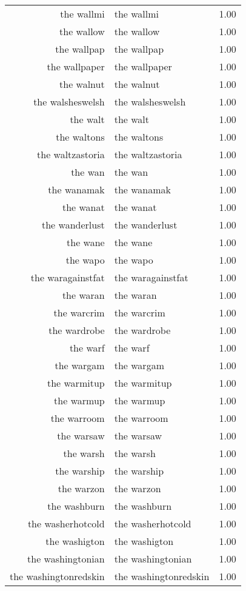 \begin{table}[ht]
\begin{tabular}{rlr}
  the wallmi & the wallmi & 1.00 \\ 
  the wallow & the wallow & 1.00 \\ 
  the wallpap & the wallpap & 1.00 \\ 
  the wallpaper & the wallpaper & 1.00 \\ 
  the walnut & the walnut & 1.00 \\ 
  the walsheswelsh & the walsheswelsh & 1.00 \\ 
  the walt & the walt & 1.00 \\ 
  the waltons & the waltons & 1.00 \\ 
  the waltzastoria & the waltzastoria & 1.00 \\ 
  the wan & the wan & 1.00 \\ 
  the wanamak & the wanamak & 1.00 \\ 
  the wanat & the wanat & 1.00 \\ 
  the wanderlust & the wanderlust & 1.00 \\ 
  the wane & the wane & 1.00 \\ 
  the wapo & the wapo & 1.00 \\ 
  the waragainstfat & the waragainstfat & 1.00 \\ 
  the waran & the waran & 1.00 \\ 
  the warcrim & the warcrim & 1.00 \\ 
  the wardrobe & the wardrobe & 1.00 \\ 
  the warf & the warf & 1.00 \\ 
  the wargam & the wargam & 1.00 \\ 
  the warmitup & the warmitup & 1.00 \\ 
  the warmup & the warmup & 1.00 \\ 
  the warroom & the warroom & 1.00 \\ 
  the warsaw & the warsaw & 1.00 \\ 
  the warsh & the warsh & 1.00 \\ 
  the warship & the warship & 1.00 \\ 
  the warzon & the warzon & 1.00 \\ 
  the washburn & the washburn & 1.00 \\ 
  the washerhotcold & the washerhotcold & 1.00 \\ 
  the washigton & the washigton & 1.00 \\ 
  the washingtonian & the washingtonian & 1.00 \\ 
  the washingtonredskin & the washingtonredskin & 1.00 \\ 

\end{tabular}
\end{table}
